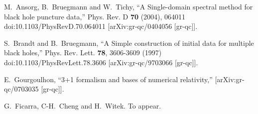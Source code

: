 \begin{thebibliography}{9}
M.~Ansorg, B.~Bruegmann and W.~Tichy,
``A Single-domain spectral method for black hole puncture data,''
Phys. Rev. D \textbf{70} (2004), 064011
doi:10.1103/PhysRevD.70.064011
[arXiv:gr-qc/0404056 [gr-qc]].

S.~Brandt and B.~Bruegmann,
``A Simple construction of initial data for multiple black holes,''
Phys. Rev. Lett. \textbf{78}, 3606-3609 (1997)
doi:10.1103/PhysRevLett.78.3606
[arXiv:gr-qc/9703066 [gr-qc]].

E.~Gourgoulhon,
``3+1 formalism and bases of numerical relativity,''
[arXiv:gr-qc/0703035 [gr-qc]].

  G.~Ficarra, C-H.~Cheng and H.~Witek. To appear.


\end{thebibliography}



